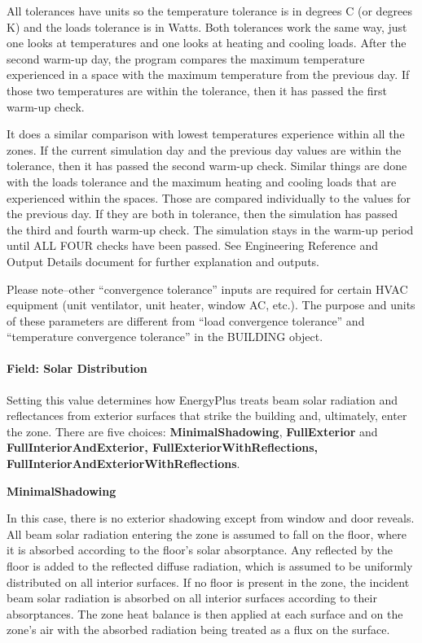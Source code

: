 All tolerances have units so the temperature tolerance is in degrees C (or degrees K) and the loads tolerance is in Watts. Both tolerances work the same way, just one looks at temperatures and one looks at heating and cooling loads. After the second warm-up day, the program compares the maximum temperature experienced in a space with the maximum temperature from the previous day. If those two temperatures are within the tolerance, then it has passed the first warm-up check.

It does a similar comparison with lowest temperatures experience within all the zones. If the current simulation day and the previous day values are within the tolerance, then it has passed the second warm-up check. Similar things are done with the loads tolerance and the maximum heating and cooling loads that are experienced within the spaces. Those are compared individually to the values for the previous day. If they are both in tolerance, then the simulation has passed the third and fourth warm-up check. The simulation stays in the warm-up period until ALL FOUR checks have been passed. See Engineering Reference and Output Details document for further explanation and outputs.

Please note--other ``convergence tolerance'' inputs are required for certain HVAC equipment (unit ventilator, unit heater, window AC, etc.). The purpose and units of these parameters are different from ``load convergence tolerance'' and ``temperature convergence tolerance'' in the BUILDING object.

\paragraph{Field: Solar Distribution}\label{field-solar-distribution}

Setting this value determines how EnergyPlus treats beam solar radiation and reflectances from exterior surfaces that strike the building and, ultimately, enter the zone. There are five choices: \textbf{MinimalShadowing}, \textbf{FullExterior} and \textbf{FullInteriorAndExterior, FullExteriorWithReflections, FullInteriorAndExteriorWithReflections}.

\textbf{MinimalShadowing}

In this case, there is no exterior shadowing except from window and door reveals. All beam solar radiation entering the zone is assumed to fall on the floor, where it is absorbed according to the floor's solar absorptance. Any reflected by the floor is added to the reflected diffuse radiation, which is assumed to be uniformly distributed on all interior surfaces. If no floor is present in the zone, the incident beam solar radiation is absorbed on all interior surfaces according to their absorptances. The zone heat balance is then applied at each surface and on the zone's air with the absorbed radiation being treated as a flux on the surface.


